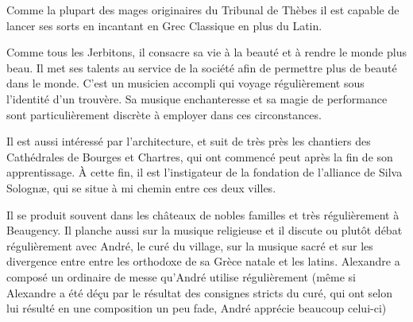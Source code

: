 Comme la plupart des mages originaires du Tribunal de Thèbes il est capable de lancer ses sorts en incantant en Grec Classique en plus du Latin.

Comme tous les Jerbitons, il consacre sa vie à la beauté et à rendre le monde plus beau. Il met ses talents au service de la société afin de permettre plus de beauté dans le monde. C'est un musicien accompli qui voyage régulièrement sous l'identité d'un trouvère. Sa musique enchanteresse et sa magie de performance sont particulièrement discrète à employer dans ces circonstances.

Il est aussi intéressé par l'architecture, et suit de très près les chantiers des Cathédrales de Bourges et Chartres, qui ont commencé peut après la fin de son apprentissage. À cette fin, il est l'instigateur de la fondation de l'alliance de Silva Solognæ, qui se situe à mi chemin entre ces deux villes.

Il se produit souvent dans les châteaux de nobles familles et très régulièrement à Beaugency. Il planche aussi sur la musique religieuse et il discute ou plutôt débat régulièrement avec André, le curé du village, sur la musique sacré et sur les divergence entre entre les orthodoxe de sa Grèce natale et les latins.
Alexandre a composé un ordinaire de messe qu'André utilise régulièrement (même si Alexandre a été déçu par le résultat des consignes stricts du curé, qui ont selon lui résulté en une composition un peu fade, André apprécie beaucoup celui-ci)

